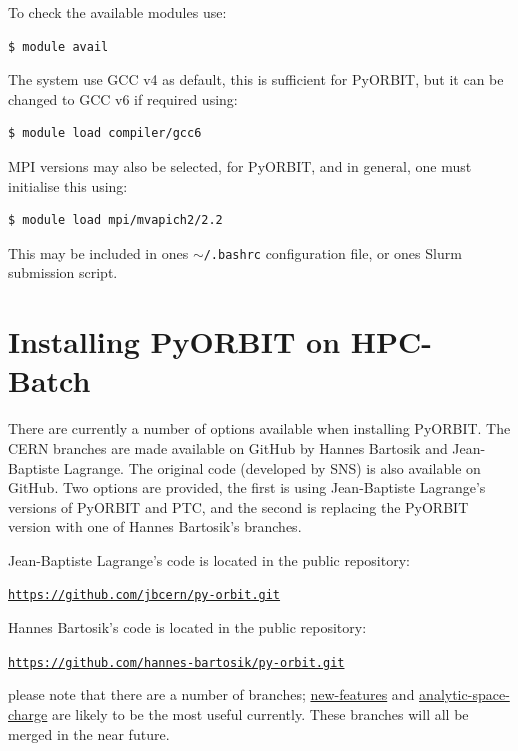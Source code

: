 \documentclass[a4paper]{cernatsnote}
\def \jbgithub {\href{https://github.com/jbcern/py-orbit}{https://github.com/jbcern/py-orbit.git}}
\def \hbgithub {\href{https://github.com/hannes-bartosik/py-orbit}{https://github.com/hannes-bartosik/py-orbit.git}}
\begin{document}
To check the available modules use:
\begin{lstlisting}[language=bash, belowskip=-3\medskipamount]
$ module avail
\end{lstlisting}

The system use GCC v4 as default, this is sufficient for PyORBIT, but it can be changed to GCC v6 if required using:
\begin{lstlisting}[language=bash, belowskip=-3\medskipamount]
$ module load compiler/gcc6
\end{lstlisting}	

MPI versions may also be selected, for PyORBIT, and in general, one must initialise this using:

\begin{lstlisting}[language=bash, belowskip=-3\medskipamount]
$ module load mpi/mvapich2/2.2
\end{lstlisting}

This may be included in ones \texttt{$\sim$/.bashrc} configuration file, or ones Slurm submission script.

\section{Installing PyORBIT on HPC-Batch}
\label{sec:install}

There are currently a number of options available when installing PyORBIT. The CERN branches are made available on GitHub by Hannes Bartosik and Jean-Baptiste Lagrange. The original code (developed by SNS) is also available on GitHub. Two options are provided, the first is using Jean-Baptiste Lagrange's versions of PyORBIT and PTC, and the second is replacing the PyORBIT version with one of Hannes Bartosik's branches.

Jean-Baptiste Lagrange's code is located in the public repository:

\texttt{\jbgithub}

Hannes Bartosik's code is located in the public repository:

\texttt{\hbgithub}

please note that there are a number of branches; \href{https://github.com/hannes-bartosik/py-orbit/tree/new-features}{new-features} and \href{https://github.com/hannes-bartosik/py-orbit/tree/analytical-space-charge}{analytic-space-charge} are likely to be the most useful currently. These branches will all be merged in the near future.
\end{document}
